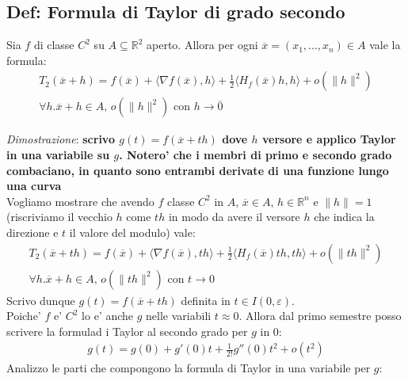 \documentclass{article}
\begin{document}
\subsection{Def: Formula di Taylor di grado secondo}

Sia $f$ di classe $C^2$ su $A \subseteq \mathbb{R}^2$ aperto. Allora per ogni 
$\overline{x} = (x_1, \ldots, x_n) \in A$ vale la formula:
\begin{align*}
  T_2(\overline{x} + h) = f(\overline{x}) + \langle \nabla f(\overline{x}), h \rangle
  + \frac{1}{2} \langle H_f(\overline{x})h, h \rangle + o(\|h\|^2) \\
  \forall h. \overline{x} + h \in A, \, o(\|h\|^2) \text{ con } h \to \overline{0}
\end{align*}

\noindent \emph{Dimostrazione}: \textbf{scrivo $g(t) = f(\overline{x} + th)$ dove $h$ versore
e applico Taylor in una variabile su $g$. Notero' che i membri di primo e secondo
grado combaciano, in quanto sono entrambi derivate di una funzione lungo una curva} \\
Vogliamo mostrare che avendo $f$ classe $C^2$ in $A$, $\overline{x} \in A$,
$h \in \mathbb{R}^n$ e $\|h\| = 1$ (riscriviamo il vecchio $h$ come $th$ in modo
da avere il versore $h$ che indica la direzione e $t$ il valore del modulo) vale:
\begin{align*}
  T_2(\overline{x} + th) = f(\overline{x}) + \langle \nabla f(\overline{x}), th \rangle
  + \frac{1}{2} \langle H_f(\overline{x})th, th \rangle + o(\|th\|^2) \\
  \forall h. \overline{x} + h \in A, \, o(\|th\|^2) \text{ con } t \to 0
\end{align*}
Scrivo dunque $g(t) = f(\overline{x} + t h)$ definita in $t \in I(0, \varepsilon)$. \\
Poiche' $f$ e' $C^2$ lo e' anche $g$ nelle variabili $t \approx 0$. Allora dal
primo semestre posso scrivere la formulad i Taylor al secondo grado per $g$ in $0$:
\begin{align*}
  g(t) = g(0) + g'(0)t + \frac{1}{2!} g''(0) t^2 + o(t^2)
\end{align*}
Analizzo le parti che compongono la formula di Taylor in una variabile per $g$:
\end{document}
